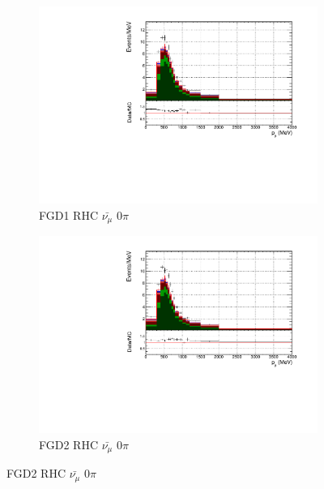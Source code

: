 \begin{figure}[!htbp]
\begin{subfigure}{0.49\textwidth}
  \centering
  \includegraphics[width=\textwidth]{figs/FGD1_anti-numuCC_0pi_p}
  \caption{FGD1 RHC $\bar{\nu_{\mu}}$ 0$\pi$}
\end{subfigure}
\begin{subfigure}{0.49\textwidth}
  \centering
  \includegraphics[width=\textwidth]{figs/FGD2_anti-numuCC_0pi_p}
  \caption{FGD2 RHC $\bar{\nu_{\mu}}$ 0$\pi$}
\end{subfigure}


\end{figure}
